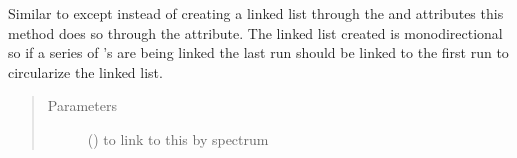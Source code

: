 \documentclass[letterpaper,10pt,english]{sphinxmanual}
\begin{document}
\begin{fulllineitems}
\begin{fulllineitems}
\end{fulllineitems}


\begin{fulllineitems}
\label{\detokenize{polo.crystallography:polo.crystallography.run.HWIRun.link_to_alt_spectrum}}
Similar to 
except instead of creating a linked list through the 
 and
attributes this method does so through the 
attribute. The linked list created is mono\sphinxhyphen{}directional so if a
series of {\hyperref[\detokenize{polo.crystallography:polo.crystallography.run.HWIRun}]{}}’s 
are being linked the last run should be linked to the
first run to circularize the linked list.
\begin{quote}\begin{description}
\item[{Parameters}] \leavevmode
{} ({\hyperref[\detokenize{polo.crystallography:polo.crystallography.run.HWIRun}]{}}) \textendash{} {\hyperref[\detokenize{polo.crystallography:polo.crystallography.run.HWIRun}]{}} to 
link to this {\hyperref[\detokenize{polo.crystallography:polo.crystallography.run.HWIRun}]{}} by spectrum

\end{description}\end{quote}

\end{fulllineitems}



\end{fulllineitems}
\end{document}
